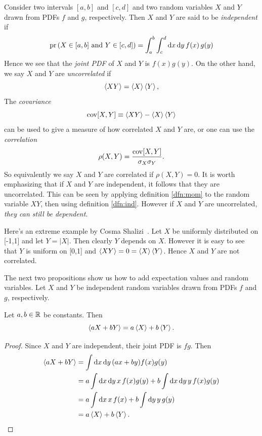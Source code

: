 Consider two intervals $[a,b]$ and $[c,d]$ and two random variables
$X$ and $Y$ drawn from PDFs $f$ and $g$, respectively. Then $X$ and $Y$ are
said to be {\it independent} if
\begin{equation}\label{dfn:ind}
  \pr{X\in[a,b]\text{ and }Y\in[c,d]}=\int_a^b\int_c^d\dd{x}\dd{y}f(x)\,g(y)
\end{equation}
Hence we see that the {\it joint PDF} of $X$ and $Y$ 
is $f(x)g(y)$. On the other hand, we say $X$ and $Y$ are {\it uncorrelated} 
 if
\begin{equation}
  \ev{XY}=\ev{X}\ev{Y},
\end{equation}
The {\it covariance}
\begin{equation}\label{dfn:cov}
  \Cov[X,Y]\equiv\ev{XY}-\ev{X}\ev{Y}
\end{equation}
can be used to give a measure of how correlated $X$ and $Y$ are, or
one can use the {\it correlation}
\begin{equation}\label{dfn:cor}
  \rho(X,Y)=\frac{\operatorname{cov}[X,Y]}{\sigma_X\sigma_Y}.
\end{equation}
So equivalently we say $X$ and $Y$ are correlated if $\rho(X,Y)=0$.
It is worth emphasizing that if $X$ and $Y$ are independent,
it follows that they are uncorrelated. This can be seen by applying
definition \eqref{dfn:mom} to the random variable $XY$, then using
definition \eqref{dfn:ind}. However if $X$ and $Y$ are
uncorrelated, {\it they can still be dependent}.
\begin{example*}{}{}
  Here's an extreme example by Cosma Shalizi~\cite{cosma_indep}. 
Let $X$ be uniformly distributed
  on [-1,1] and let $Y=|X|$. Then clearly $Y$ depends on $X$. However it 
  is easy to see that $Y$ is uniform on [0,1] and $\ev{XY}=0=\ev{X}\ev{Y}$. 
  Hence $X$ and $Y$ are not correlated.
\end{example*}

The next two propositions show us how to add expectation values and
random variables. Let $X$ and $Y$ be independent random variables 
drawn from PDFs $f$ and $g$, respectively.
\begin{proposition}{}{}
  Let $a,b\in\mathbb{R}$ be constants. Then
  $$\ev{aX+bY}=a\ev{X}+b\ev{Y}.$$
  \begin{proof}
    Since $X$ and $Y$ are independent, their joint PDF is $fg$. Then
    \begin{equation*}
      \begin{aligned}
      \ev{aX+bY}&=\int\dd{x}\dd{y}(ax+by)f(x)g(y)\\
                &=a\int\dd{x}\dd{y}x\,f(x)g(y)+
                 b\int\dd{x}\dd{y}y\,f(x)g(y)\\
                &=a\int\dd{x}x\,f(x)+b\int\dd{y}y\,g(y)\\
                &=a\ev{X}+b\ev{Y}.
      \end{aligned}
    \end{equation*}
  \end{proof}
\end{proposition}

